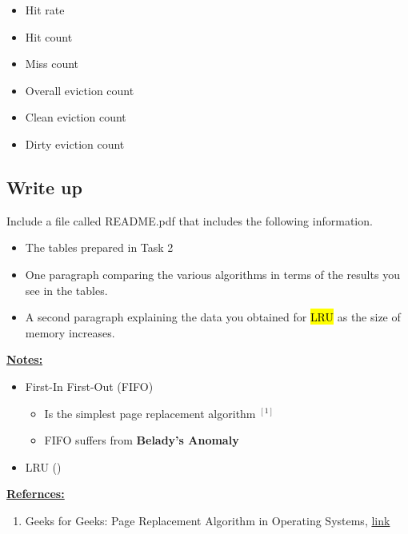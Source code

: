 \documentclass[12pt]{article}
\begin{document}
\bigskip

\begin{itemize}
    \item Hit rate
    \item Hit count
    \item Miss count
    \item Overall eviction count
    \item Clean eviction count
    \item Dirty eviction count
\end{itemize}


\subsection{Write up}

\noindent Include a file called README.pdf that includes the following information.

\begin{itemize}
    \item The tables prepared in Task 2
    \item One paragraph comparing the various algorithms in terms of the results
    you see in the tables.
    \item A second paragraph explaining the data you obtained for \hl{LRU} as the size
    of memory increases.
\end{itemize}

\bigskip

\underline{\textbf{Notes:}}

\bigskip

\begin{itemize}
    \item First-In First-Out (FIFO)
    \begin{itemize}
        \item Is the simplest page replacement algorithm $^{[1]}$
        \item FIFO suffers from \textbf{Belady's Anomaly}
    \end{itemize}
    \item LRU ()
\end{itemize}

\bigskip

\underline{\textbf{Refernces:}}

\bigskip

\begin{enumerate}[1)]
    \item Geeks for Geeks: Page Replacement Algorithm in Operating Systems, \href{https://www.geeksforgeeks.org/page-replacement-algorithms-in-operating-systems/#:~:text=First%20In%20First%20Out%20(FIFO,queue%20is%20selected%20for%20removal.}{link}
\end{enumerate}
\end{document}
